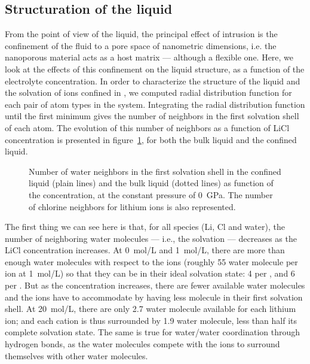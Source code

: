 \documentclass[thesis]{subfiles}
\begin{document}
\subsection{Structuration of the liquid}
\label{sec:liquid-structure}

From the point of view of the liquid, the principal effect of intrusion is the
confinement of the fluid to a pore space of nanometric dimensions, i.e. the
nanoporous material acts as a host matrix --- although a flexible one. Here, we
look at the effects of this confinement on the liquid structure, as a function
of the electrolyte concentration. In order to characterize the structure of the
liquid and the solvation of ions confined in , we computed radial
distribution function for each pair of atom types in the system. Integrating the
radial distribution function until the first minimum gives the number of
neighbors in the first solvation shell of each atom. The evolution of this
number of neighbors as a function of LiCl concentration is presented in
figure~\ref{fig:licl-zif:neighbors}, for both the bulk liquid and the confined
liquid.

\begin{figure}[ht]
    \centering
    
    \caption{Number of water neighbors in the first solvation shell in the
    confined liquid (plain lines) and the bulk liquid (dotted lines) as
    function of the concentration, at the constant pressure of \SI{0}{GPa}.
    The number of chlorine neighbors for lithium ions is also represented.}
    \label{fig:licl-zif:neighbors}
\end{figure}

The first thing we can see here is that, for all species (Li, Cl and water), the
number of neighboring water molecules --- i.e., the solvation --- decreases as
the LiCl concentration increases. At \SI{0}{mol/L} and \SI{1}{mol/L}, there are
more than enough water molecules with respect to the ions (roughly 55 water
molecule per ion at \SI{1}{mol/L}) so that they can be in their ideal solvation
state: 4  per , and 6  per . But as the
concentration increases, there are fewer available water molecules and the ions
have to accommodate by having less molecule in their first solvation shell. At
\SI{20}{mol/L}, there are only 2.7 water molecule available for each lithium
ion; and each cation is thus surrounded by 1.9 water molecule, less than half
its complete solvation state. The same is true for water/water coordination
through hydrogen bonds, as the water molecules compete with the ions to surround
themselves with other water molecules.
\end{document}
